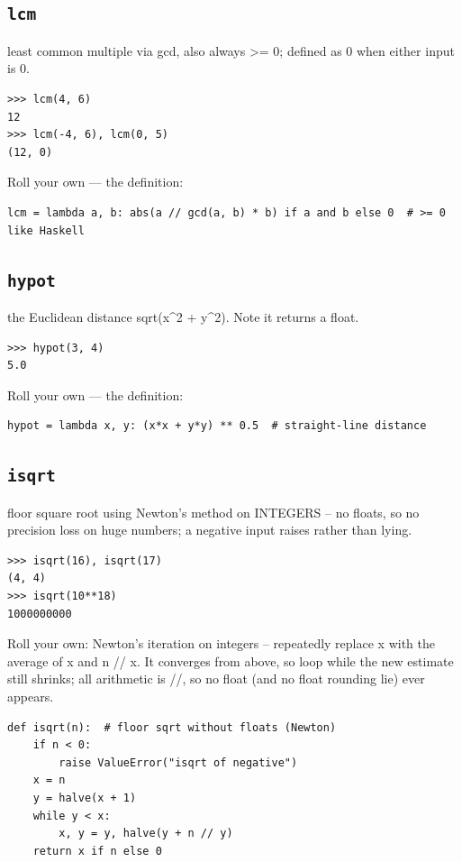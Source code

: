 \documentclass[10pt,letterpaper]{book}
\begin{document}
\subsection{\texttt{lcm}}\label{def:lcm}
least common multiple via gcd, also always >= 0; defined as 0 when either input is 0.
\begin{lstlisting}[style=ex]
>>> lcm(4, 6)
12
>>> lcm(-4, 6), lcm(0, 5)
(12, 0)
\end{lstlisting}

Roll your own --- the definition:

\begin{lstlisting}[style=ex]
lcm = lambda a, b: abs(a // gcd(a, b) * b) if a and b else 0  # >= 0 like Haskell
\end{lstlisting}
\subsection{\texttt{hypot}}\label{def:hypot}
the Euclidean distance sqrt(x\^{}2 + y\^{}2). Note it returns a float.
\begin{lstlisting}[style=ex]
>>> hypot(3, 4)
5.0
\end{lstlisting}

Roll your own --- the definition:

\begin{lstlisting}[style=ex]
hypot = lambda x, y: (x*x + y*y) ** 0.5  # straight-line distance
\end{lstlisting}
\subsection{\texttt{isqrt}}\label{def:isqrt}
floor square root using Newton's method on INTEGERS -- no floats, so no precision loss on huge numbers; a negative input raises rather than lying.
\begin{lstlisting}[style=ex]
>>> isqrt(16), isqrt(17)
(4, 4)
>>> isqrt(10**18)
1000000000
\end{lstlisting}

Roll your own: Newton's iteration on integers -- repeatedly replace x with the average of x and n // x. It converges from above, so loop while the new estimate still shrinks; all arithmetic is //, so no float (and no float rounding lie) ever appears.

\begin{lstlisting}[style=ex]
def isqrt(n):  # floor sqrt without floats (Newton)
    if n < 0:
        raise ValueError("isqrt of negative")
    x = n
    y = halve(x + 1)
    while y < x:
        x, y = y, halve(y + n // y)
    return x if n else 0
\end{lstlisting}
\end{document}
